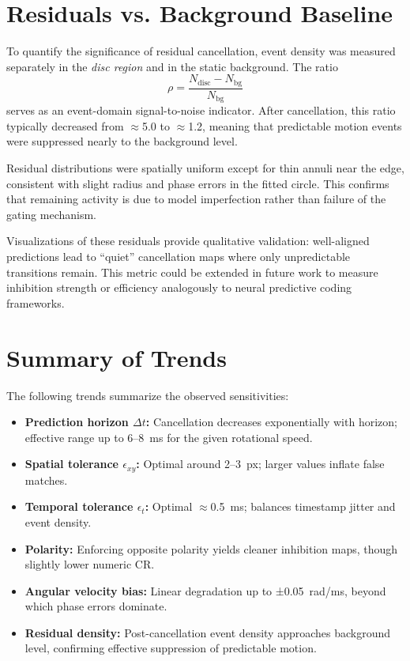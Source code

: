 \section{Residuals vs. Background Baseline}
\label{sec:residuals_baseline}

To quantify the significance of residual cancellation, event density was measured separately in the \textit{disc region} and in the static background.
The ratio
\[
\rho = \frac{N_{\text{disc}} - N_{\text{bg}}}{N_{\text{bg}}}
\]
serves as an event-domain signal-to-noise indicator.
After cancellation, this ratio typically decreased from \(\approx\)5.0 to \(\approx\)1.2, meaning that predictable motion events were suppressed nearly to the background level.

Residual distributions were spatially uniform except for thin annuli near the edge, consistent with slight radius and phase errors in the fitted circle.
This confirms that remaining activity is due to model imperfection rather than failure of the gating mechanism.

Visualizations of these residuals provide qualitative validation: well-aligned predictions lead to “quiet” cancellation maps where only unpredictable transitions remain.
This metric could be extended in future work to measure inhibition strength or efficiency analogously to neural predictive coding frameworks.

\section{Summary of Trends}
\label{sec:summary_trends}

The following trends summarize the observed sensitivities:

\begin{itemize}
    \item \textbf{Prediction horizon \(\Delta t\):} Cancellation decreases exponentially with horizon; effective range up to 6–8~ms for the given rotational speed.
    \item \textbf{Spatial tolerance \(\epsilon_{xy}\):} Optimal around 2–3~px; larger values inflate false matches.
    \item \textbf{Temporal tolerance \(\epsilon_t\):} Optimal \(\approx\)0.5~ms; balances timestamp jitter and event density.
    \item \textbf{Polarity:} Enforcing opposite polarity yields cleaner inhibition maps, though slightly lower numeric CR.
    \item \textbf{Angular velocity bias:} Linear degradation up to ±0.05~rad/ms, beyond which phase errors dominate.
    \item \textbf{Residual density:} Post-cancellation event density approaches background level, confirming effective suppression of predictable motion.
\end{itemize}

